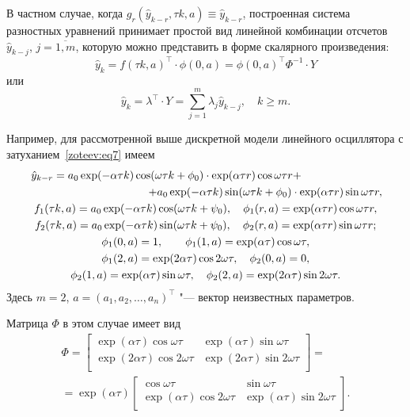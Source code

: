 В частном случае, когда $g_r(\hat{y}_{k-r},\tau k,a) \equiv \hat{y}_{k-r}$, построенная система разностных уравнений принимает простой вид линейной комбинации отсчетов $\hat{y}_{k-j}$, $j=\overline{1,m}$, которую можно представить в форме скалярного произведения:
$$
\hat{y}_k=f(\tau k,a)^{\top}\cdot \phi(0,a)=\phi(0,a)^{\top}\Phi^{-1}\cdot Y
$$
 или
$$
\hat{y}_k=\lambda^{\top}\cdot Y=\sum_{j=1}^{m} \lambda_j\hat{y}_{k-j}, \quad k \geq m.
$$

Например, для рассмотренной выше дискретной модели линейного осциллятора с затуханием~\eqref{zoteev:eq7} имеем
\begin{gather}
\hat{y}_{k-r}=a_0\exp(-\alpha\tau k)\cos(\omega\tau k+\phi_0)\cdot\exp(\alpha\tau r)\cos\omega\tau r+
\hspace{2.5cm}
\\
\hspace{3.8cm}
+a_0\exp(-\alpha\tau k)\sin(\omega\tau k+\phi_0)\cdot\exp(\alpha\tau r)\sin\omega\tau r,
\\
f_1(\tau k,a)=a_0\exp(-\alpha\tau k)\cos(\omega\tau k+\psi_0), \quad \phi_1(r,a)=\exp(\alpha\tau r)\cos\omega\tau r,
\\
f_2(\tau k,a)=a_0\exp(-\alpha\tau k)\sin(\omega\tau k+\psi_0), \quad \phi_2(r,a)=\exp(\alpha\tau r)\sin\omega\tau r;
\\
\phi_1(0,a)=1, \qquad \phi_1(1,a)=\exp(\alpha\tau)\cos\omega\tau, 
\\
\phi_1(2,a)=\exp(2\alpha\tau)\cos2\omega\tau, \quad \phi_2(0,a)=0,
\\
\phi_2(1,a)=\exp(\alpha\tau)\sin\omega\tau, \quad \phi_2(2,a)=\exp(2\alpha\tau)\sin2\omega\tau.
\end{gather}
Здесь $m=2$, $a=(a_1,a_2,\dots,a_n)^{\top}$ "--- вектор неизвестных параметров.

Матрица $\Phi$ в этом случае имеет вид
\begin{multline}
\Phi=\begin{bmatrix}
\exp(\alpha\tau)\cos\omega\tau & \exp(\alpha\tau)\sin\omega\tau \\
\exp(2\alpha\tau)\cos2\omega\tau & \exp(2\alpha\tau)\sin2\omega\tau \\
\end{bmatrix}=
\\
=\exp(\alpha\tau)\begin{bmatrix}
\cos\omega\tau & \sin\omega\tau \\
\exp(\alpha\tau)\cos2\omega\tau & \exp(\alpha\tau)\sin2\omega\tau \\
\end{bmatrix}.
\end{multline}

